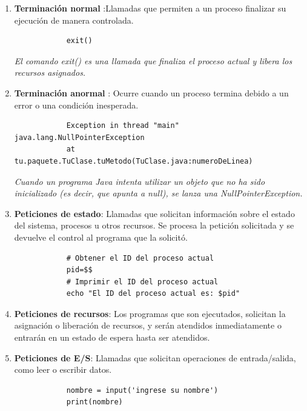	\begin{tcolorbox}
	\begin{enumerate}
		\item\textbf{Terminación normal }:Llamadas que permiten a un proceso finalizar su ejecución de manera controlada.
		
		\begin{lstlisting}
			exit()
		\end{lstlisting}
		\textit{El comando exit() es una llamada que finaliza el proceso actual y libera los recursos asignados.}
		
		\item\textbf{Terminación anormal }: Ocurre cuando un proceso termina debido a un error o una condición inesperada.
		
		\begin{lstlisting}
			Exception in thread "main" java.lang.NullPointerException
			at tu.paquete.TuClase.tuMetodo(TuClase.java:numeroDeLinea)
		\end{lstlisting}
		
		
		
		\textit{Cuando un programa Java intenta utilizar un objeto que no ha sido inicializado (es decir, que apunta a null), se lanza una NullPointerException. }
		
		\item \textbf{Peticiones de estado}: Llamadas que solicitan información sobre el estado del sistema, procesos u otros recursos. Se procesa la petición solicitada y se devuelve el control al programa que la solicitó.
		
		\begin{lstlisting}
			# Obtener el ID del proceso actual
			pid=$$
			# Imprimir el ID del proceso actual
			echo "El ID del proceso actual es: $pid"
		\end{lstlisting}
		
		
		
		\item \textbf{Peticiones de recursos}:  Los programas que son ejecutados, solicitan la asignación o liberación de recursos, y serán atendidos inmediatamente o entrarán en un estado de espera hasta ser atendidos.
	
		
		\item \textbf{Peticiones de E/S}: Llamadas que solicitan operaciones de entrada/salida, como leer o escribir datos.
		\begin{lstlisting}
			nombre = input('ingrese su nombre')
			print(nombre)
		\end{lstlisting}
		
	
	\end{enumerate}
	
	
\end{tcolorbox}

